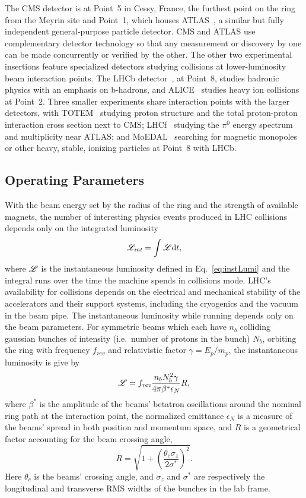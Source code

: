 The CMS detector is at Point~5 in Cessy, France, the furthest point on the ring from the Meyrin site and Point~1, which houses ATLAS~\cite{Aad:2008zzm}, a similar but fully independent general-purpose particle detector.
CMS and ATLAS use complementary detector technology so that any measurement or discovery by one can be made concurrently or verified by the other.
The other two experimental insertions feature specialized detectors studying collisions at lower-luminosity beam interaction points.
The LHCb detector~\cite{Alves:2008zz}, at Point~8, studies hadronic physics with an emphasis on b-hadrons, and ALICE~\cite{Aamodt:2008zz} studies heavy ion collisions at Point~2\@.
Three smaller experiments share interaction points with the larger detectors, with TOTEM~\cite{Anelli:2008zza} studying proton structure and the total proton-proton interaction cross section next to CMS\@; LHCf~\cite{Adriani:2008zz} studying the $\pi^0$ energy spectrum and multiplicity near ATLAS\@; and MoEDAL~\cite{Acharya:2014nyr} searching for magnetic monopoles or other heavy, stable, ionizing particles at Point~8 with LHCb.



\subsection{Operating Parameters}
With the beam energy set by the radius of the ring and the strength of available magnets, the number of interesting physics events produced in LHC collisions depends only on the integrated luminosity
\begin{equation}
  \mathscr{L}_\textit{int} = \int \mathscr{L} \mathrm{d}t,
\end{equation}
where $\mathscr{L}$ is the instantaneous luminosity defined in Eq.~\ref{eq:instLumi} and the integral runs over the time the machine spends in collisions mode.
LHC's availability for collisions depends on the electrical and mechanical stability of the accelerators and their support systems, including the cryogenics and the vacuum in the beam pipe.
The instantaneous luminosity while running depends only on the beam parameters.
For symmetric beams which each have $n_b$ colliding gaussian bunches of intensity (i.e.\ number of protons in the bunch) $N_b$, orbiting the ring with frequency $f_\textit{rev}$ and relativistic factor $\gamma=E_p/m_p$, the instantaneous luminosity is give by
\begin{equation}
  \mathscr{L} = f_\textit{rev} \frac{n_b N_b^2 \gamma}{4\pi \beta^\ast \epsilon_N} R,
\end{equation}
where $\beta^\ast$ is the amplitude of the beams' betatron oscillations around the nominal ring path at the interaction point, the normalized emittance $\epsilon_N$ is a measure of the beams' spread in both position and momentum space, and $R$ is a geometrical factor accounting for the beam crossing angle,
\begin{equation}
  R = \sqrt{1 + \left(\frac{\theta_c \sigma_z}{2\sigma^\ast}\right)^2}.
\end{equation}
Here $\theta_c$ is the beams' crossing angle, and $\sigma_z$ and $\sigma^\ast$ are respectively the longitudinal and transverse RMS widths of the bunches in the lab frame.


